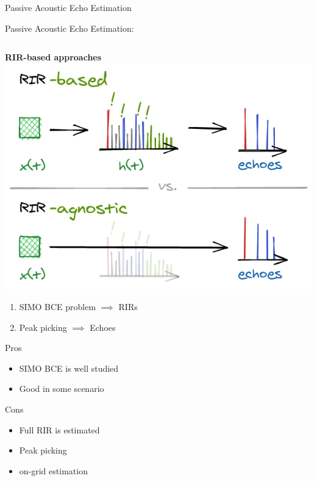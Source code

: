 \begin{frame}{Passive Acoustic Echo Estimation}

    \begin{block}{\alert{Passive} Acoustic Echo Estimation:}

        \vspace{1em}
        \small
        \begin{columns}[T,onlytextwidth] %
            \begin{column}{.48\textwidth}
                \textbf{RIR-\alert{based} approaches}
                \includegraphics[trim={0 31em 0 7em},clip,width=.9\textwidth]{./figures/based-agnostic.png}
                \begin{enumerate}
                    \item SIMO BCE problem $\implies$ RIRs
                    \item Peak picking $\implies$ Echoes
                \end{enumerate}
                Pros
                \begin{itemize}
                    \item SIMO BCE is well studied %
                    \item Good in some scenario %
                \end{itemize}
                Cons
                \begin{itemize}
                    \item Full RIR is estimated
                    \item Peak picking
                    \item on-grid estimation %

\end{itemize}
\end{column}
\end{columns}
\end{block}
\end{frame}
